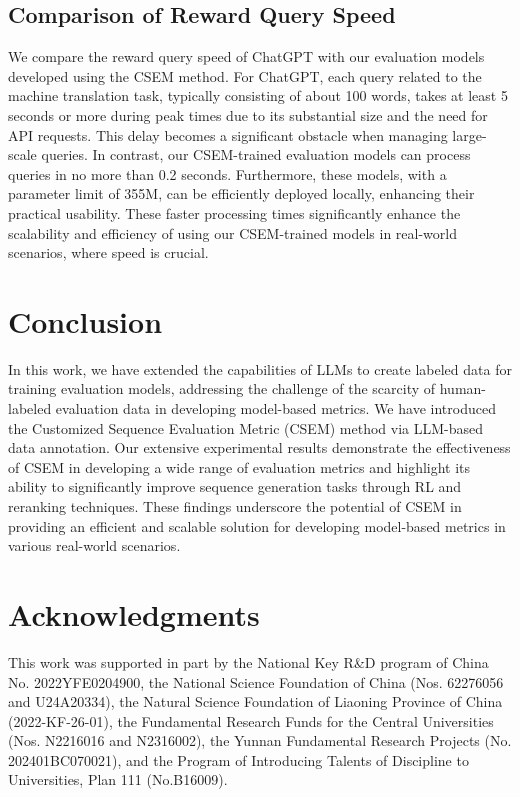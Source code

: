 \documentclass[lettersize,journal]{IEEEtran}
\begin{document}
\subsection{Comparison of Reward Query Speed} \label{sec:reward_query_efficiency}
We compare the reward query speed of ChatGPT with our evaluation models developed using the CSEM method. For ChatGPT, each query related to the machine translation task, typically consisting of about 100 words, takes at least 5 seconds or more during peak times due to its substantial size and the need for API requests. This delay becomes a significant obstacle when managing large-scale queries. In contrast, our CSEM-trained evaluation models can process queries in no more than 0.2 seconds. Furthermore, these models, with a parameter limit of 355M, can be efficiently deployed locally, enhancing their practical usability. These faster processing times significantly enhance the scalability and efficiency of using our CSEM-trained models in real-world scenarios, where speed is crucial.


\section{Conclusion}
In this work, we have extended the capabilities of LLMs to create labeled data for training evaluation models, addressing the challenge of the scarcity of human-labeled evaluation data in developing model-based metrics. We have introduced the Customized Sequence Evaluation Metric (CSEM) method via LLM-based data annotation. Our extensive experimental results demonstrate the effectiveness of CSEM in developing a wide range of evaluation metrics and highlight its ability to significantly improve sequence generation tasks through RL and reranking techniques. These findings underscore the potential of CSEM in providing an efficient and scalable solution for developing model-based metrics in various real-world scenarios.

\section*{Acknowledgments}
This work was supported in part by the National Key R\&D program of China No. 2022YFE0204900, the National Science Foundation of China (Nos. 62276056 and U24A20334), the Natural Science Foundation of Liaoning Province of China (2022-KF-26-01), the Fundamental Research Funds for the Central Universities (Nos. N2216016 and N2316002), the Yunnan Fundamental Research Projects (No. 202401BC070021), and the Program of Introducing Talents of Discipline to Universities, Plan 111 (No.B16009).



%

\vspace{4mm}

% 

\vfill
\end{document}
